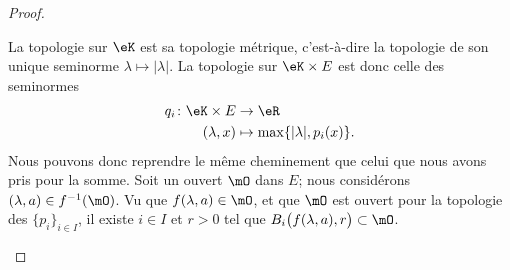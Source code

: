 \begin{proof}
\begin{subproof}
		La topologie sur \( \eK\) est sa topologie métrique, c'est-à-dire la topologie de son unique seminorme \( \lambda\mapsto | \lambda |\). La topologie sur \( \eK\times E\) est donc celle des seminormes
		\begin{equation}        \label{EQooFSBEooWDsHot}
			\begin{aligned}
				q_i\colon \eK\times E & \to \eR                                \\
				(\lambda,x)           & \mapsto \max\{ | \lambda |, p_i(x) \}.
			\end{aligned}
		\end{equation}
		Nous pouvons donc reprendre le même cheminement que celui que nous avons pris pour la somme. Soit un ouvert \( \mO\) dans \( E\); nous considérons \( (\lambda, a)\in f^{-1}(\mO)\). Vu que \( f(\lambda, a)\in \mO\), et que \( \mO\) est ouvert pour la topologie des \( \{ p_i \}_{i\in I}\), il existe \( i\in I\) et \( r>0\) tel que \( B_i\big( f(\lambda,a), r \big)\subset\mO\).


\end{subproof}
\end{proof}
